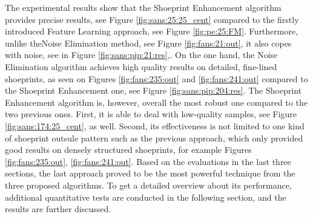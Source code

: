 \documentclass[draft,final]{vutinfth} %
\begin{document}

\par
The experimental results show that the Shoeprint Enhancement algorithm provides precise results, see Figure \ref{fig:sans:25:25_cent} compared to the firstly introduced Feature Learning approach, see Figure \ref{fig:pe:25:FM}.
Furthermore, unlike theNoise Elimination method, see Figure \ref{fig:fans:21:out}, it also copes with noise, see in Figure \ref{fig:sans:pip:21:res},.
On the one hand, the Noise Elimination algorithm achieves high quality results on detailed, fine-lined shoeprints, as seen on Figures \ref{fig:fans:235:out} and \ref{fig:fans:241:out} compared to the Shoeprint Enhancement one, see Figure \ref{fig:sans:pip:204:res}.
The Shoeprint Enhancement algorithm is, however, overall the most robust one compared to the two previous ones.
First, it is able to deal with low-quality samples, see Figure \ref{fig:sans:174:25_cent}, as well.
Second, its effectiveness is not limited to one kind of shoeprint outsule pattern such as the previous approach, which only provided good results on densely structured shoeprints, for example Figures \ref{fig:fans:235:out}, \ref{fig:fans:241:out}. 
Based on the evaluations in the last three sections, the last approach proved to be the most powerful technique from the three proposed algorithms.
To get a detailed overview about its performance, additional quantitative tests are conducted in the following section, and the results are further discussed.
\end{document}
